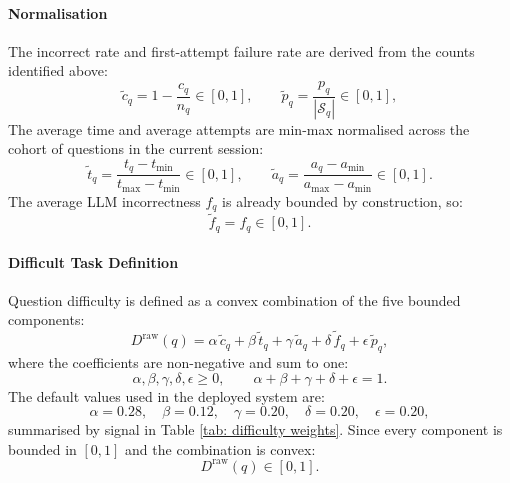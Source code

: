 \paragraph{Normalisation}
The incorrect rate and first-attempt failure rate are derived from the counts identified above: 
\begin{equation*}
    \tilde{c}_{q} = 1 - \frac{c_{q}}{n_{q}} \in [0,1], 
    \qquad
    \tilde{p}_{q} = \frac{p_{q}}{|\mathcal{S}_{q}|} \in [0,1],
\end{equation*}
The average time and average attempts are min-max normalised across the cohort of questions in the current session:
\begin{equation*}
    \tilde{t}_{q} = \frac{t_{q} - t_{\min}}{t_{\max} - t_{\min}} \in [0,1],
    \qquad
    \tilde{a}_{q} = \frac{a_{q} - a_{\min}}{a_{\max} - a_{\min}} \in [0,1].
\end{equation*}
The average LLM incorrectness $f_{q}$ is already bounded by construction, so:
\begin{equation*}
    \tilde{f}_{q} = f_{q} \in [0,1].
\end{equation*}



\paragraph{Difficult Task Definition}
Question difficulty is defined as a convex combination of the five bounded components:
\begin{equation}
    D^{\mathrm{raw}}(q)
    = \alpha\,\tilde{c}_{q}
    + \beta\,\tilde{t}_{q}
    + \gamma\,\tilde{a}_{q}
    + \delta\,\tilde{f}_{q}
    + \epsilon\,\tilde{p}_{q},
    \label{eq:difficulty-raw}
\end{equation}
where the coefficients are non-negative and sum to one:
\begin{equation*}
    \alpha,\beta,\gamma,\delta,\epsilon \geqslant 0,
    \qquad
    \alpha+\beta+\gamma+\delta+\epsilon = 1.
\end{equation*}
The default values used in the deployed system are:
\begin{equation*}
    \alpha = 0.28, \quad
    \beta  = 0.12, \quad
    \gamma = 0.20, \quad
    \delta = 0.20, \quad
    \epsilon = 0.20,
\end{equation*}
summarised by signal in Table \ref{tab: difficulty weights}.  Since every component is bounded in $[0,1]$ and the combination is convex:
\begin{equation*}
    D^{\mathrm{raw}}(q) \in [0,1].
\end{equation*}

